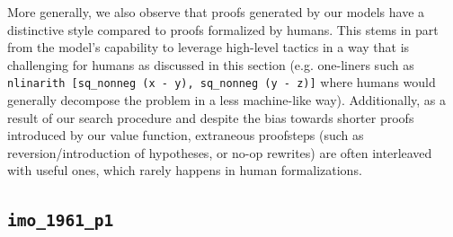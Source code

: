 \documentclass[nohyperref]{article}
\theoremstyle{plain}
\theoremstyle{definition}
\theoremstyle{remark}
\begin{document}
More generally, we also observe that proofs generated by our models have a distinctive style compared to proofs formalized by humans. This stems in part from the model's capability to leverage high-level tactics in a way that is challenging for humans as discussed in this section (e.g. one-liners such as \texttt{nlinarith [sq\_nonneg (x - y), sq\_nonneg (y - z)]} where humans would generally decompose the problem in a less machine-like way). Additionally, as a result of our search procedure and despite the bias towards shorter proofs introduced by our value function, extraneous proofsteps (such as reversion/introduction of hypotheses, or no-op rewrites) are often interleaved with useful ones, which rarely happens in human formalizations.

\newpage

\subsection*{\texttt{imo\_1961\_p1}}
\label{exprob2}
\end{document}

